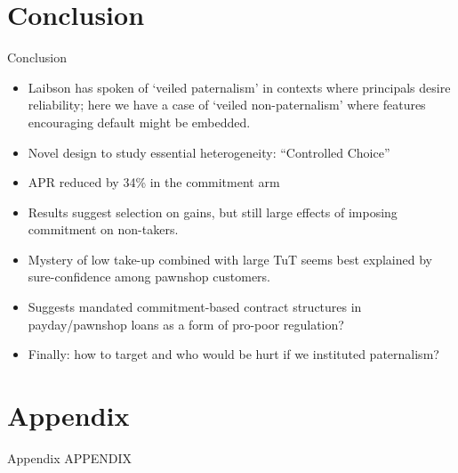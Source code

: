 \documentclass[8pt]{beamer}
\begin{document}
\section{Conclusion}
\begin{frame}{Conclusion}
    \begin{itemize}
     \vfill \item Laibson has spoken of `veiled paternalism' in contexts where principals desire reliability; here we have a case of `veiled non-paternalism' where features encouraging default might be embedded.
     \vfill \item Novel design to study essential heterogeneity: ``Controlled Choice''
        \vfill \item  APR reduced by 34\% in the commitment arm
        \vfill  \item Results suggest selection on gains, but still large effects of imposing commitment on non-takers.
        \vfill \item Mystery of low take-up combined with large TuT seems best explained by sure-confidence among pawnshop customers.
        
        \vfill \item Suggests mandated commitment-based contract structures in payday/pawnshop loans as a form of pro-poor regulation?
        \vfill\item Finally:  how to target and who would be hurt if we instituted  paternalism? 
        
    \end{itemize}  
\end{frame}

\appendix



\section{Appendix}


\begin{frame}{Appendix}
\vfill \centering APPENDIX
\end{frame}
\end{document}
